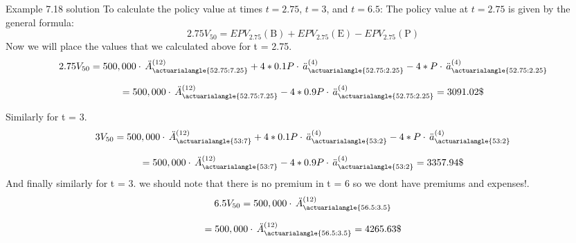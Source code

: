 \begin{solve}{}{Example 7.18 solution}
		To calculate the policy value at times \(t = 2.75\), \(t = 3\), and \(t = 6.5\):
		The policy value at  \(t = 2.75 \) is given by the general formula:
		\[
		2.75V_{50} = EPV_{2.75}(\text{B}) + EPV_{2.75}(\text{E}) -  EPV_{2.75}(\text{P})
		\]
		Now we will place the values that we calculated above for t = 2.75.
		\[
		2.75V_{50} = 500,000 \cdot \,  \ddot{A}_{\actuarialangle{52.75:7.25}}^{(12)} + 4 * 0.1P \cdot \, \ddot{a}_{\actuarialangle{52.75:2.25}}^{(4)} - 4 * P \cdot \, \ddot{a}_{\actuarialangle{52.75:2.25}}^{(4)}
		\]
		
		$$= 
		500,000 \cdot \,  \ddot{A}_{\actuarialangle{52.75:7.25}}^{(12)} - 4 * 0.9P \cdot \, \ddot{a}_{\actuarialangle{52.75:2.25}}^{(4)} = 3091.02\$ $$
		
	
		Similarly for t = 3.
		\[
		3V_{50} = 500,000 \cdot \,  \ddot{A}_{\actuarialangle{53:7}}^{(12)} + 4 * 0.1P \cdot \, \ddot{a}_{\actuarialangle{53:2}}^{(4)} - 4 * P \cdot \, \ddot{a}_{\actuarialangle{53:2}}^{(4)}
		\]
		
		$$= 
		500,000 \cdot \,  \ddot{A}_{\actuarialangle{53:7}}^{(12)} - 4 * 0.9P \cdot \, \ddot{a}_{\actuarialangle{53:2}}^{(4)} = 3357.94\$ $$
		And finally similarly for t = 3.
		we should note that there is no premium in t = 6 so we dont have premiums and expenses!.
		\[
		6.5V_{50} = 500,000 \cdot \,  \ddot{A}_{\actuarialangle{56.5:3.5}}^{(12)} 
		\]
		
		$$= 
		500,000 \cdot \,  \ddot{A}_{\actuarialangle{56.5:3.5}}^{(12)} = 4265.63\$ $$
		
	
		
	\end{solve}
	
	\vspace{2ex}
	
	
	
%	
%	
%	

